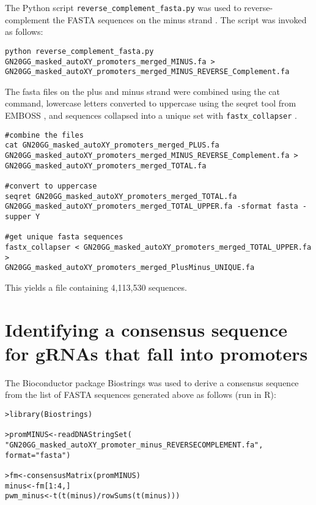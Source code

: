 The Python script \verb|reverse_complement_fasta.py| was used to reverse-complement the FASTA sequences on the minus strand \cite{Kao:Online}. The script was invoked as follows:

\begin{small}\begin{lstlisting}
python reverse_complement_fasta.py GN20GG_masked_autoXY_promoters_merged_MINUS.fa >
GN20GG_masked_autoXY_promoters_merged_MINUS_REVERSE_Complement.fa
\end{lstlisting}\end{small}

The fasta files on the plus and minus strand were combined using the cat command, lowercase letters converted to uppercase using the seqret tool from EMBOSS \cite{Rice:2000wr}, and sequences collapsed into a unique set with \verb|fastx_collapser| \cite{Hannon:Online} . 

\begin{small}\begin{lstlisting}
#combine the files
cat GN20GG_masked_autoXY_promoters_merged_PLUS.fa 
GN20GG_masked_autoXY_promoters_merged_MINUS_REVERSE_Complement.fa > GN20GG_masked_autoXY_promoters_merged_TOTAL.fa

#convert to uppercase 
seqret GN20GG_masked_autoXY_promoters_merged_TOTAL.fa 
GN20GG_masked_autoXY_promoters_merged_TOTAL_UPPER.fa -sformat fasta -supper Y   

#get unique fasta sequences
fastx_collapser < GN20GG_masked_autoXY_promoters_merged_TOTAL_UPPER.fa >
GN20GG_masked_autoXY_promoters_merged_PlusMinus_UNIQUE.fa

\end{lstlisting}\end{small}

This yields a file containing 4,113,530 sequences.

\section{Identifying a consensus sequence for gRNAs that fall into promoters}

The Bioconductor package Biostrings \cite{Biostrings} was used to derive a consensus sequence from the list of FASTA sequences generated above as follows (run in R):

\begin{small}\begin{lstlisting}
>library(Biostrings)

>promMINUS<-readDNAStringSet(
"GN20GG_masked_autoXY_promoter_minus_REVERSECOMPLEMENT.fa", format="fasta")  

>fm<-consensusMatrix(promMINUS) 
minus<-fm[1:4,] 
pwm_minus<-t(t(minus)/rowSums(t(minus)))  

\end{lstlisting}\end{small}

